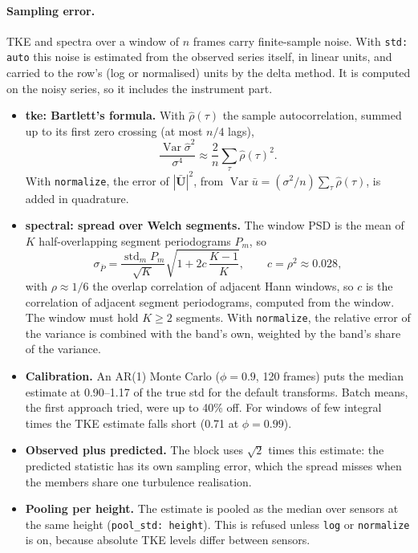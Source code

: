 \documentclass[11pt,a4paper]{article}
\begin{document}
\paragraph{Sampling error.} TKE and spectra over a window of $n$ frames carry
finite-sample noise. With \texttt{std: auto} this noise is estimated from the
observed series itself, in linear units, and carried to the row's (log or
normalised) units by the delta method. It is computed on the noisy series, so
it includes the instrument part.
\begin{itemize}
\item \textbf{tke: Bartlett's formula.} With $\hat\rho(\tau)$ the sample
  autocorrelation, summed up to its first zero crossing (at most $n/4$ lags),
  \begin{equation}
    \frac{\operatorname{Var}\hat\sigma^2}{\sigma^4}
    \approx \frac{2}{n}\sum_{\tau} \hat\rho(\tau)^2 .
  \end{equation}
  With \texttt{normalize}, the error of $|\bar{\bm U}|^2$, from
  $\operatorname{Var}\bar u = (\sigma^2/n)\sum_\tau\hat\rho(\tau)$, is added in
  quadrature.
\item \textbf{spectral: spread over Welch segments.} The window PSD is the
  mean of $K$ half-overlapping segment periodograms $P_m$, so
  \begin{equation}
    \sigma_{\bar P} = \frac{\operatorname{std}_m P_m}{\sqrt K}
      \sqrt{1 + 2c\,\frac{K-1}{K}},
    \qquad c = \rho^2 \approx 0.028,
  \end{equation}
  with $\rho \approx 1/6$ the overlap correlation of adjacent Hann windows, so
  $c$ is the correlation of adjacent segment periodograms, computed from the
  window. The window must hold $K \ge 2$ segments. With
  \texttt{normalize}, the relative error of the variance is combined with the
  band's own, weighted by the band's share of the variance.
\item \textbf{Calibration.} An AR(1) Monte Carlo ($\phi = 0.9$, 120 frames)
  puts the median estimate at 0.90--1.17 of the true std for the default
  transforms. Batch means, the first approach tried, were up to 40\% off.
  For windows of few integral times the TKE estimate falls short (0.71 at
  $\phi = 0.99$).
\item \textbf{Observed plus predicted.} The block uses $\sqrt2$ times this
  estimate: the predicted statistic has its own sampling error, which the
  spread misses when the members share one turbulence realisation.
\item \textbf{Pooling per height.} The estimate is pooled as the median over
  sensors at the same height (\texttt{pool\_std: height}). This is refused
  unless \texttt{log} or \texttt{normalize} is on, because absolute TKE levels
  differ between sensors.
\end{itemize}
\end{document}
